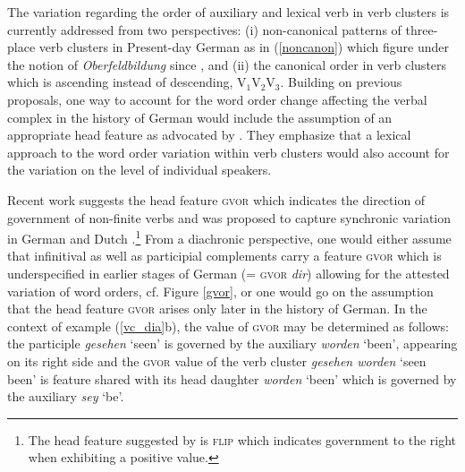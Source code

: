 \documentclass[output=paper
                ,modfonts
                ,nonflat
	        ,collection
	        ,collectionchapter
	        ,collectiontoclongg
 	        ,biblatex
                ,babelshorthands
                ,newtxmath
                ,draftmode
                ,colorlinks, citecolor=brown
]{./langsci/langscibook}
\begin{document}
The variation regarding the order of auxiliary and lexical verb in verb clusters is currently addressed from two perspectives: (i) non-canonical patterns of three-place verb clusters in Present-day German as in (\ref{noncanon}) which figure under the notion of \textit{Oberfeldbildung} since \cite{bech1983}, and (ii) the canonical order in  verb clusters which is ascending instead of descending, \ie V$_1$V$_2$V$_3$. Building on previous proposals, one way to account for the word order change affecting the verbal complex in the history of German would include the assumption of an appropriate head feature as advocated by \cite{HiNa94}. They emphasize that a lexical approach to the word order variation within verb clusters would also account for the variation on the level of individual speakers.

Recent work suggests the head feature \textsc{gvor} which indicates the direction of government of non-finite verbs and was proposed to capture synchronic variation in German and Dutch \citep{BoNo1996,kathol2000,augustinus2015}.\footnote{The head feature suggested by \cite{HiNa94} is \textsc{flip} which indicates government to the right when exhibiting a positive value.} From a diachronic perspective, one would either assume that infinitival as well as participial complements carry a feature \textsc{gvor} which is underspecified in earlier stages of German (= \textsc{gvor} \textit{dir}) allowing for the attested variation of word orders, cf. Figure \ref{gvor}, or one would go on the assumption that the head feature \textsc{gvor} arises only later in the history of German. In the context of example (\ref{vc_dia}b), the value of \textsc{gvor} may be determined as follows: the participle \textit{gesehen} `seen' is governed by the auxiliary \textit{worden} `been', appearing on its right side and the \textsc{gvor} value of the verb cluster \textit{gesehen worden} `seen been' is feature shared with its head daughter \textit{worden} `been' which is governed by the auxiliary \textit{sey} `be'.  
\end{document}
